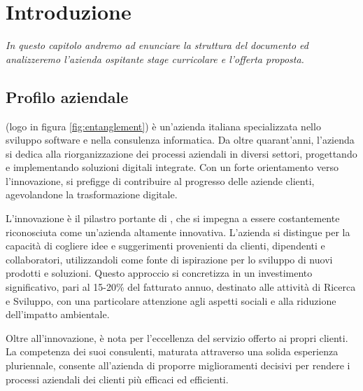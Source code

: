 \chapter{Introduzione}
\label{cap:introduzione}
%
%
%
%
%
%
%
\emph{In questo capitolo andremo ad enunciare la struttura del documento ed analizzeremo l'azienda ospitante stage curricolare e l'offerta proposta.}



\section{Profilo aziendale}

\myCompany (logo in figura \ref{fig:entanglement}) è un'azienda italiana specializzata nello sviluppo software e nella consulenza informatica. Da oltre quarant'anni, l'azienda si dedica alla riorganizzazione dei processi aziendali in diversi settori, progettando e implementando soluzioni digitali integrate. Con un forte orientamento verso l'innovazione, \myCompany si prefigge di contribuire al progresso delle aziende clienti, agevolandone la trasformazione digitale.

L'innovazione è il pilastro portante di \myCompany, che si impegna a essere costantemente riconosciuta come un'azienda altamente innovativa. L'azienda si distingue per la capacità di cogliere idee e suggerimenti provenienti da clienti, dipendenti e collaboratori, utilizzandoli come fonte di ispirazione per lo sviluppo di nuovi prodotti e soluzioni. Questo approccio si concretizza in un investimento significativo, pari al 15-20\% del fatturato annuo, destinato alle attività di Ricerca e Sviluppo, con una particolare attenzione agli aspetti sociali e alla riduzione dell'impatto ambientale.

Oltre all'innovazione, \myCompany è nota per l'eccellenza del servizio offerto ai propri clienti. La competenza dei suoi consulenti, maturata attraverso una solida esperienza pluriennale, consente all'azienda di proporre miglioramenti decisivi per rendere i processi aziendali dei clienti più efficaci ed efficienti.

